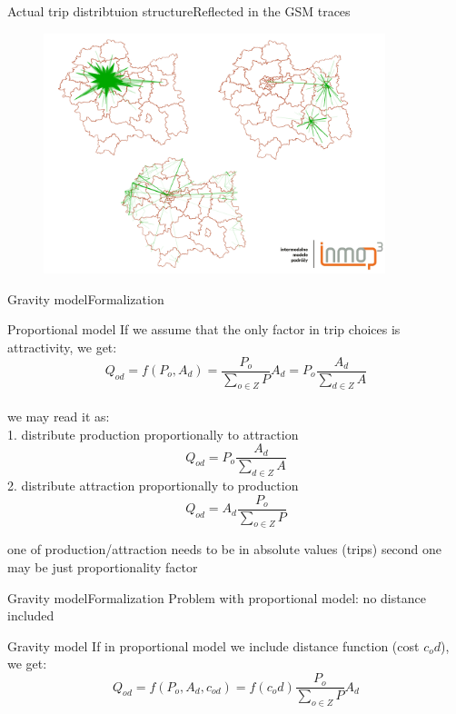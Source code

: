 \documentclass[8pt]{beamer}
\begin{document}
\begin{frame}{Actual trip distribtuion structure}{Reflected in the GSM traces}
\begin{figure}
\begin{center}
\includegraphics[height=7cm]{8}
 \end{center}
 \end{figure} 
 \end{frame}
 
\begin{frame}{Gravity model}{Formalization}
\begin{block}{Proportional model}
If we assume that the only factor in trip choices is attractivity, we get:
\begin{equation*}
Q_{od}=f(P_o,A_d) = \frac{P_o}{\sum_{o \in Z} P} A_d = P_o \frac{A_d}{\sum_{d \in Z} A}
\end{equation*}
\\
we may read it as:\\
1. distribute production proportionally to attraction
\begin{equation*}
Q_{od}=P_o \frac{A_d}{\sum_{d \in Z} A}
\end{equation*}
2. distribute attraction proportionally to production
\begin{equation*}
Q_{od}=A_d \frac{P_o}{\sum_{o \in Z} P}
\end{equation*}
\end{block}
one of production/attraction needs to be in absolute values (trips) second one may be just proportionality factor
\end{frame}

\begin{frame}{Gravity model}{Formalization}
Problem with proportional model: \alert{no distance included}
\begin{block}{Gravity model}
If in proportional model we include distance function (cost $c_od$), we get:
\begin{equation*}
Q_{od}=f(P_o,A_d, c_{od}) = f(c_od) \frac{P_o}{\sum_{o \in Z} P} A_d 
\end{equation*}
\end{block}
\end{frame}
\end{document}
